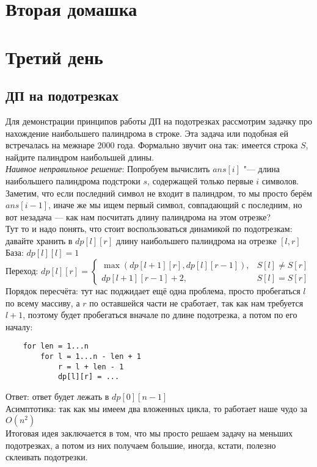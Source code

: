 \documentclass[a4paper, 12pt]{article}
\theoremstyle{plain}
\theoremstyle{definition}
\theoremstyle{remark}
\begin{document}
\section[ДЗ 2]{Вторая домашка}
%
\section{Третий день}
\subsection{ДП на подотрезках}
Для демонстрации принципов работы ДП на подотрезках рассмотрим задачку про нахождение наибольшего палиндрома в строке. Эта задача или подобная ей встречалась на межнаре 2000 года. Формально звучит она так: имеется строка $S$, найдите палиндром наибольшей длины.\\
\textit{Наивное неправильное решение}: Попробуем вычислить $ans[i]$ "--- длина наибольшего палиндрома подстроки $s$, содержащей только первые $i$ символов. Заметим, что если последний символ не входит в палиндром, то мы просто берём $ans[i-1]$, иначе же мы ищем первый символ, совпадающий с последним, но вот незадача --- как нам посчитать длину палиндрома на этом отрезке?\\
Тут то и надо понять, что стоит воспользоваться динамикой по подотрезкам: давайте хранить в $dp[l][r]$ длину наибольшего палиндрома на отрезке $[l,r]$\\
База: $dp[l][l]=1$\\
Переход: $dp[l][r]=\begin{cases}
	\max(dp[l+1][r], dp[l][r-1]), &S[l]\not=S[r]\\
	dp[l+1][r-1]+2, &S[l]=S[r]
\end{cases}$\\
Порядок пересчёта: тут нас поджидает ещё одна проблема, просто пробегаться $l$ по всему массиву, а $r$ по оставшейся части не сработает, так как нам требуется  $l+1$, поэтому будет пробегаться вначале по длине подотрезка, а потом по его началу:
\begin{verbatim}
	for len = 1...n
	    for l = 1...n - len + 1
	        r = l + len - 1
	        dp[l][r] = ...
\end{verbatim}
Ответ: ответ будет лежать в $dp[0][n-1]$\\
Асимптотика: так как мы имеем два вложенных цикла, то работает наше чудо за $O(n^2)$\\
Итоговая идея заключается в том, что мы просто решаем задачу на меньших подотрезках, а потом из них получаем большие, иногда, кстати, полезно склеивать подотрезки.
\end{document}
